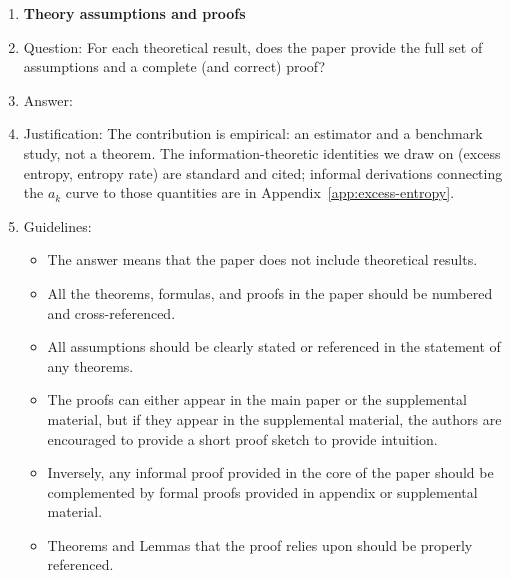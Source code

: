 \begin{enumerate}
\begin{itemize}
        \item While the authors might fear that complete honesty about limitations might be used by reviewers as grounds for rejection, a worse outcome might be that reviewers discover limitations that aren't acknowledged in the paper. The authors should use their best judgment and recognize that individual actions in favor of transparency play an important role in developing norms that preserve the integrity of the community. Reviewers will be specifically instructed to not penalize honesty concerning limitations.
    \end{itemize}

\item {\bf Theory assumptions and proofs}
    \item[] Question: For each theoretical result, does the paper provide the full set of assumptions and a complete (and correct) proof?
    \item[] Answer: \answerNA{}
    \item[] Justification: The contribution is empirical: an estimator and a benchmark study, not a theorem. The information-theoretic identities we draw on (excess entropy, entropy rate) are standard and cited; informal derivations connecting the $a_k$ curve to those quantities are in Appendix~\ref{app:excess-entropy}.
    \item[] Guidelines:
    \begin{itemize}
        \item The answer \answerNA{} means that the paper does not include theoretical results.
        \item All the theorems, formulas, and proofs in the paper should be numbered and cross-referenced.
        \item All assumptions should be clearly stated or referenced in the statement of any theorems.
        \item The proofs can either appear in the main paper or the supplemental material, but if they appear in the supplemental material, the authors are encouraged to provide a short proof sketch to provide intuition.
        \item Inversely, any informal proof provided in the core of the paper should be complemented by formal proofs provided in appendix or supplemental material.
        \item Theorems and Lemmas that the proof relies upon should be properly referenced.
    \end{itemize}


\end{enumerate}
